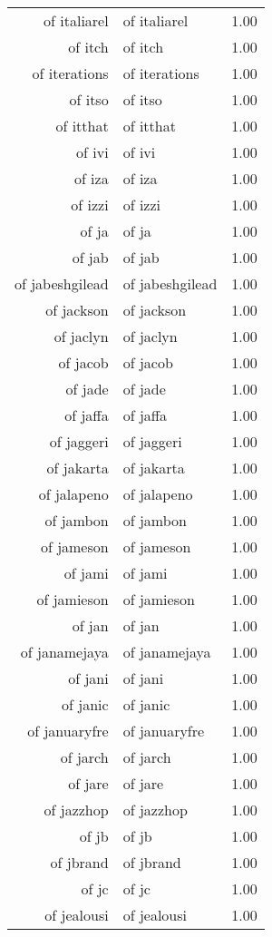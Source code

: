 \begin{table}[ht]
\begin{tabular}{rlr}
  of italiarel & of italiarel & 1.00 \\ 
  of itch & of itch & 1.00 \\ 
  of iterations & of iterations & 1.00 \\ 
  of itso & of itso & 1.00 \\ 
  of itthat & of itthat & 1.00 \\ 
  of ivi & of ivi & 1.00 \\ 
  of iza & of iza & 1.00 \\ 
  of izzi & of izzi & 1.00 \\ 
  of ja & of ja & 1.00 \\ 
  of jab & of jab & 1.00 \\ 
  of jabeshgilead & of jabeshgilead & 1.00 \\ 
  of jackson & of jackson & 1.00 \\ 
  of jaclyn & of jaclyn & 1.00 \\ 
  of jacob & of jacob & 1.00 \\ 
  of jade & of jade & 1.00 \\ 
  of jaffa & of jaffa & 1.00 \\ 
  of jaggeri & of jaggeri & 1.00 \\ 
  of jakarta & of jakarta & 1.00 \\ 
  of jalapeno & of jalapeno & 1.00 \\ 
  of jambon & of jambon & 1.00 \\ 
  of jameson & of jameson & 1.00 \\ 
  of jami & of jami & 1.00 \\ 
  of jamieson & of jamieson & 1.00 \\ 
  of jan & of jan & 1.00 \\ 
  of janamejaya & of janamejaya & 1.00 \\ 
  of jani & of jani & 1.00 \\ 
  of janic & of janic & 1.00 \\ 
  of januaryfre & of januaryfre & 1.00 \\ 
  of jarch & of jarch & 1.00 \\ 
  of jare & of jare & 1.00 \\ 
  of jazzhop & of jazzhop & 1.00 \\ 
  of jb & of jb & 1.00 \\ 
  of jbrand & of jbrand & 1.00 \\ 
  of jc & of jc & 1.00 \\ 
  of jealousi & of jealousi & 1.00 \\ 

\end{tabular}
\end{table}
